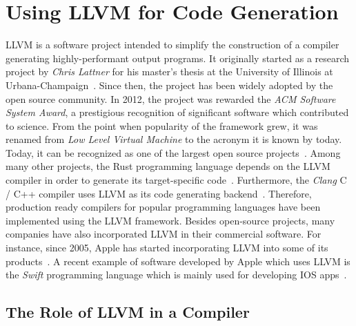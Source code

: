 \section{Using LLVM for Code Generation}


LLVM is a software project intended to simplify the construction of a compiler generating highly-performant output programs.
It originally started as a research project by \emph{Chris Lattner} for his master's thesis at the University of Illinois at Urbana-Champaign~\cite{Lattner:MSThesis02}.
Since then, the project has been widely adopted by the open source community.
In 2012, the project was rewarded the \emph{ACM Software System Award}, a prestigious recognition of significant software which contributed to science.
From the point when popularity of the framework grew, it was renamed from \emph{Low Level Virtual Machine} to the acronym it is known by today.
Today, it can be recognized as one of the largest open source projects~\cite[preface]{Cardoso_Lopes2014-jt}.
Among many other projects, the Rust programming language depends on the LLVM compiler in order to generate its target-specific code~\cite[p.~373]{McNamara2021-hz}.
Furthermore, the \emph{Clang} C / C++ compiler uses LLVM as its code generating backend~\cite[preface]{Hsu2021-ez}.
Therefore, production ready compilers for popular programming languages have been implemented using the LLVM framework.
Besides open-source projects, many companies have also incorporated LLVM in their commercial software.
For instance, since 2005, Apple has started incorporating LLVM into some of its products~\cite[pp.~11-15]{Fandrey}.
A recent example of software developed by Apple which uses LLVM is the \emph{Swift} programming language which is mainly used for developing IOS apps~\cite[preface]{Hsu2021-ez}.

\subsection{The Role of LLVM in a Compiler}

